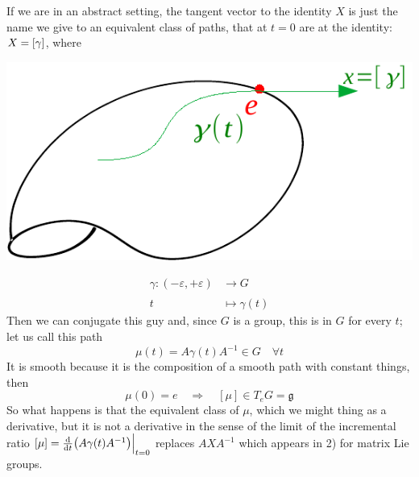 \documentclass[../main.tex]{subfiles}
\begin{document}
If we are in an abstract setting, the tangent vector to the identity $X$ is just the name we give to an equivalent class of paths, that at $t=0$ are at the identity: $X=\bqty{\gamma}$, where
\begin{marginfigure}
    \includegraphics{images/abstract_question.pdf}
    \caption*{}
\end{marginfigure}
\begin{align*}
    \gamma:(-\varepsilon,+\varepsilon)&\xrightarrow[]{}G\\
    t&\mapsto\gamma(t)
\end{align*}
Then we can conjugate this guy and, since $G$ is a group, this is in $G$ for every $t$; let us call this path
\[
\mu(t)=A\gamma(t)A^{-1}\in G \quad \forall t
\]
It is smooth because it is the composition of a smooth path with constant things, then 
\[
\mu(0)=e\quad \Rightarrow \quad [\mu]\in T_eG=\mathfrak{g}
\]
So what happens is that the equivalent class of $\mu$, which we might thing as a derivative, but it is not a derivative in the sense of the limit of the incremental ratio $[\mu]=\dv{t}(A\gamma(t)A^{-1})\Bigr|_{\substack{t=0}}$ replaces $AXA^{-1}$ which appears in 2) for matrix Lie groups.
\end{document}
